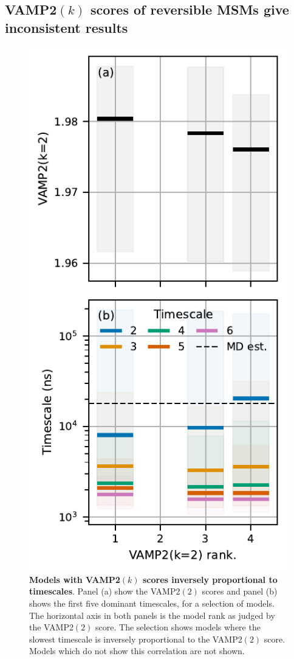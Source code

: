 \documentclass[journal=jacsat,manuscript=article]{achemso}
\begin{document}
\subsection{VAMP2$(k)$ scores of reversible MSMs give inconsistent results}
\begin{figure}
    \centering
    \includegraphics{figures/bad_vamp_ranks.pdf}
    \caption{\textbf{Models with VAMP2$(k)$ scores inversely proportional to timescales}. Panel (a) show the VAMP2$(2)$ scores and panel (b) shows the first five dominant timescales, for a selection of models.  The horizontal axis in both panels is the model rank as judged by the VAMP2$(2)$ score. The selection shows models where the slowest timescale is inversely proportional to the VAMP2$(2)$ score. Models which do not show this correlation are not shown. }
    \label{fig:bad_vamp_scores}
\end{figure}
\end{document}
